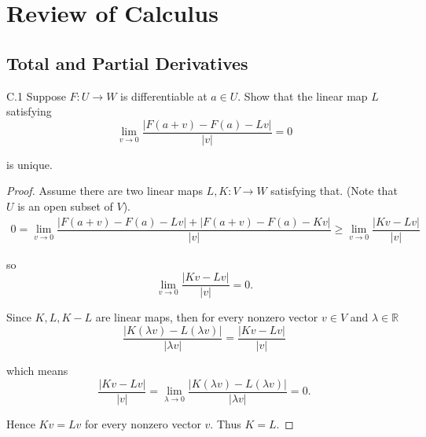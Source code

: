 \chapter{Review of Calculus}

\section{Total and Partial Derivatives}

\begin{exercise}{C.1}
    Suppose \( F: U \to W \) is differentiable at \( a \in U \). Show that the linear map \( L \) satisfying
    \[
        \lim\limits_{v \to 0} \dfrac{\left\vert F(a + v) - F(a) - Lv \right\vert}{\left\vert v \right\vert} = 0
    \]

    is unique.
\end{exercise}

\begin{proof}
    Assume there are two linear maps \( L, K: V \to W \) satisfying that. (Note that \( U \) is an open subset of \( V \)).
    \begingroup
    \allowdisplaybreaks%
    \begin{align*}
        0 = \lim\limits_{v \to 0} \dfrac{\left\vert F(a + v) - F(a) - Lv \right\vert + \left\vert F(a + v) - F(a) - Kv \right\vert}{\left\vert v \right\vert} \ge \lim\limits_{v \to 0} \dfrac{\left\vert Kv - Lv \right\vert}{\left\vert v \right\vert}
    \end{align*}
    \endgroup

    so
    \[
        \lim\limits_{v \to 0} \dfrac{\left\vert Kv - Lv \right\vert}{\left\vert v \right\vert} = 0.
    \]

    Since \( K, L, K - L \) are linear maps, then for every nonzero vector \( v \in V \) and \( \lambda \in \mathbb{R} \)
    \[
        \dfrac{\left\vert K(\lambda v) - L(\lambda v) \right\vert}{\left\vert \lambda v \right\vert} = \dfrac{\left\vert Kv - Lv \right\vert}{\left\vert v \right\vert}
    \]

    which means
    \[
        \dfrac{\left\vert Kv - Lv \right\vert}{\left\vert v \right\vert} = \lim\limits_{\lambda \to 0} \dfrac{\left\vert K(\lambda v) - L(\lambda v) \right\vert}{\left\vert \lambda v \right\vert} = 0.
    \]

    Hence \( Kv = Lv \) for every nonzero vector \( v \). Thus \( K = L \).
\end{proof}

